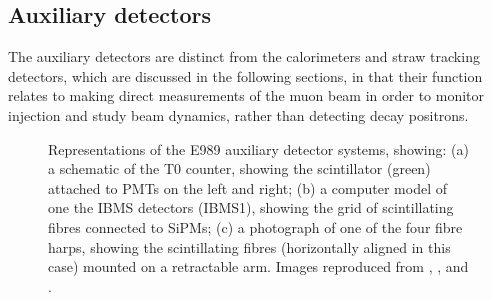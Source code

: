 \subsection{Auxiliary detectors}\label{subsec:Aux}

The auxiliary detectors are distinct from the calorimeters and straw tracking detectors, which are discussed in the following sections, in that their function relates to making direct measurements of the muon beam in order to monitor injection and study beam dynamics, rather than detecting decay positrons. 

\begin{figure}[t!]
\centering{}
\hfill
{}\hfill
{}
\caption{Representations of the E989 auxiliary detector systems, showing: (a) a schematic of the T0 counter, showing the scintillator (green) attached to PMTs on the left and right; (b) a computer model of one the IBMS detectors (IBMS1), showing the grid of scintillating fibres connected to SiPMs; (c) a photograph of one of the four fibre harps, showing the scintillating fibres (horizontally aligned in this case) mounted on a retractable arm. Images reproduced from \cite{T0}, \cite{IBMS}, and \cite{FibreHarpPoster}.}
\label{fig:AuxDetectors}
\end{figure} 

